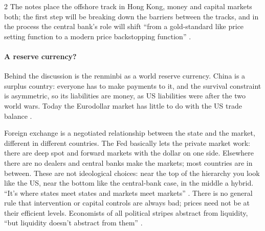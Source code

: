 \begin{paracol}{2}
The notes place the offshore track in Hong Kong, money and capital markets both; the first step will be breaking down the barriers between the tracks, and in the process the central bank's
role will shift ``from a gold-standard like price setting function to a modern price backstopping function'' .

\paragraph{A reserve currency?} Behind the discussion is the renminbi as a world reserve currency. China is a surplus country: everyone has to make payments to it,
and the survival constraint is asymmetric, so its liabilities are money, as US liabilities were after the two world wars. Today the Eurodollar market has little to
do with the US trade balance .

\begin{intuition}
Foreign exchange is a negotiated relationship between the state and the market, different in different countries. The Fed basically lets the private market
work: there are deep spot and forward markets with the dollar on one side. Elsewhere there are no dealers and central banks make the markets; most countries are
in between. These are not ideological choices: near the top of the hierarchy you look like the US, near the bottom like the central-bank case, in the middle a
hybrid. ``It's where states meet states and markets meet markets'' . There is no
general rule that intervention or capital controls are always bad; prices need not be at their efficient levels. Economists of all political stripes abstract
from liquidity, ``but liquidity doesn't abstract from them'' .
\end{intuition}


\end{paracol}

